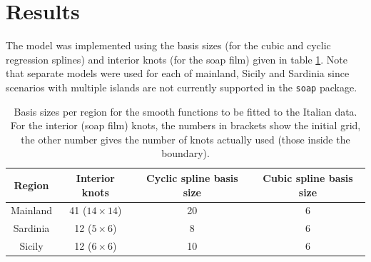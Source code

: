 \section{Results \label{ER}}

The model was implemented using the basis sizes (for the cubic and cyclic regression splines) and interior knots (for the soap film) given in table \ref{soap-basis-table}. Note that separate models were used for each of mainland, Sicily and Sardinia since scenarios with multiple islands are not currently supported in the \texttt{soap} package.

\begin{table}[t]
\centering
\begin{tabular}{c c c c}\\
Region & Interior knots & Cyclic spline basis size & Cubic spline basis size\\
\hline
Mainland & 41 ($14 \times 14$) & 20 & 6\\
Sardinia & 12 ($5 \times 6$) & 8 & 6\\
Sicily & 12 ($6 \times 6$) & 10 & 6\\
\end{tabular}
\caption{Basis sizes per region for the smooth functions to be fitted to the Italian data. For the interior (soap film) knots, the numbers in brackets show the initial grid, the other number gives the number of knots actually used (those inside the boundary).}
\label{soap-basis-table}
\end{table}

